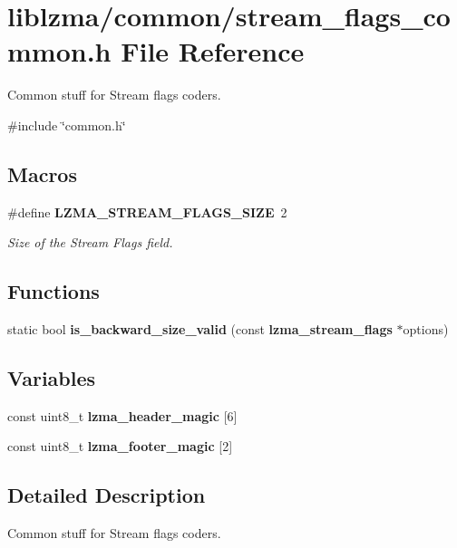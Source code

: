 \section{liblzma/common/stream\+\_\+flags\+\_\+common.h File Reference}
\label{stream__flags__common_8h}


Common stuff for Stream flags coders.  


{\ttfamily \#include \char`\"{}common.\+h\char`\"{}}\newline
\subsection*{Macros}
\begin{DoxyCompactItemize}
\item 
\#define \textbf{ L\+Z\+M\+A\+\_\+\+S\+T\+R\+E\+A\+M\+\_\+\+F\+L\+A\+G\+S\+\_\+\+S\+I\+ZE}~2
\begin{DoxyCompactList}\small\item\em Size of the Stream Flags field. \end{DoxyCompactList}\end{DoxyCompactItemize}
\subsection*{Functions}
\begin{DoxyCompactItemize}
\item 
\mbox{\label{stream__flags__common_8h_a8bb1747bfa005f63f00ab2f576464117}} 
static bool {\bfseries is\+\_\+backward\+\_\+size\+\_\+valid} (const \textbf{ lzma\+\_\+stream\+\_\+flags} $\ast$options)
\end{DoxyCompactItemize}
\subsection*{Variables}
\begin{DoxyCompactItemize}
\item 
\mbox{\label{stream__flags__common_8h_a1ae7a722e96e0a5ccc0a7e4dab78ecb7}} 
const uint8\+\_\+t {\bfseries lzma\+\_\+header\+\_\+magic} [6]
\item 
\mbox{\label{stream__flags__common_8h_a8c7c559062ae632559191a1ecd1f754b}} 
const uint8\+\_\+t {\bfseries lzma\+\_\+footer\+\_\+magic} [2]
\end{DoxyCompactItemize}


\subsection{Detailed Description}
Common stuff for Stream flags coders. 




